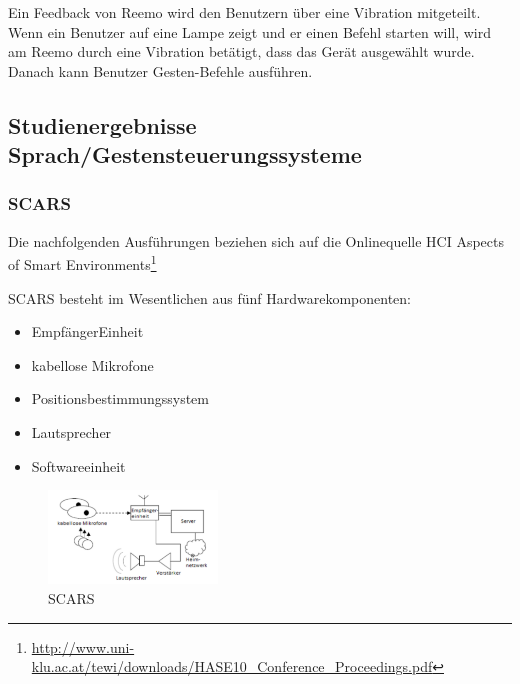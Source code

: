 \noindent
Ein Feedback von Reemo wird den Benutzern über eine Vibration mitgeteilt. Wenn ein Benutzer auf eine Lampe zeigt und er einen Befehl starten will, wird am Reemo durch eine Vibration betätigt, dass das Gerät ausgewählt wurde. Danach kann Benutzer Gesten-Befehle ausführen.

\subsection{Studienergebnisse Sprach/Gestensteuerungssysteme}

\subsubsection{SCARS}

Die nachfolgenden Ausführungen beziehen sich auf die Onlinequelle \glqq HCI Aspects of Smart Environments\grqq\footnote{\url{http://www.uni-klu.ac.at/tewi/downloads/HASE10_Conference_Proceedings.pdf}}

\noindent
SCARS besteht im Wesentlichen aus fünf Hardwarekomponenten:

\begin{itemize}
\item EmpfängerEinheit
\item kabellose Mikrofone
\item Positionsbestimmungssystem
\item Lautsprecher
\item Softwareeinheit
\end{itemize}

\begin{figure}[h!]
	\centering
	\includegraphics[width=0.4\textwidth]{img/Feedback-Mechanismen/SCARS.png}
	\caption{SCARS}
	\label{fig:feedbackSCARS}
\end{figure}

